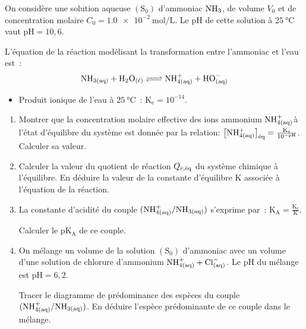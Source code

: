 On considère une solution aqueuse $(\mathrm{S_{0}})$ d'ammoniac $\ce{NH3}$, de
volume $V_{0}$ et de concentration molaire $C_{0}=\qty{1.0e-2}{\mol\per\L}$. Le
$\mathrm{pH}$ de cette solution à $\qty{25}{\degreeCelsius}$ vaut
$\mathrm{pH}=10,6$.

L'équation de la réaction modélisant la transformation entre l'ammoniac et l'eau
est~:
\[
    \ce{NH_{3(aq)} + H2O_{(\ell)} <=> NH^{+}_{4(aq)} + HO^{-}_{(aq)}}
\]

\begin{donnees}
    \begin{itemize}
        \item Produit ionique de l'eau à $\qty{25}{\degreeCelsius}$~:
              $\mathrm{K_{e}}=10^{-14}$.
    \end{itemize}
\end{donnees}
\begin{enumerate}
    \item Montrer que la concentration molaire effective des ions ammonium
          $\ce{NH^+_{4(aq)}}$à l'état d'équilibre du système est donnée par la
          relation:
          $\bigl[\ce{NH^+_{4(aq)}}\bigr]_{\eq}=
          \frac{\mathrm{K_{e}}}{10^{-\mathrm{pH}}}$.
          Calculer sa valeur.

    \item Calculer la valeur du quotient de réaction $Q_{r,\eq}$ du système
          chimique à l'équilibre. En déduire la valeur de la constante
          d'équilibre $\mathrm{K}$ associée à l'équation de la réaction.

    \item La constante d'acidité du couple $(\ce{NH^+_{4(aq)}}/\ce{NH_{3(aq)}})$
          s'exprime par~: $\mathrm{K_A}=\frac{\mathrm{K_e}}{\mathrm{K}}$.

          Calculer le $\mathrm{pK_A}$ de ce couple.

    \item On mélange un volume de la solution $(\mathrm{S_{0}})$ d'ammoniac avec
          un volume d'une solution de chlorure d'ammonium
          $\ce{NH^+_{4(aq)} + Cl^-_{(aq)}}$. Le $\mathrm{pH}$ du mélange est
          $\mathrm{pH}=6,2$.
    
          Tracer le diagramme de prédominance des espèces du couple
          $(\ce{NH^+_{4(aq)}}/\ce{NH_{3(aq)}})$. En déduire l'espèce
          prédominante de ce couple dans le mélange.
\end{enumerate}

